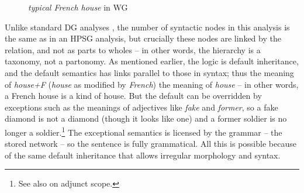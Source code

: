 \documentclass[output=paper
 	        ,biblatex
                ,babelshorthands
                ,newtxmath
                ,draftmode
                ,colorlinks, citecolor=brown
]{langscibook}
\begin{document}
\begin{figure}
	\centering
{}
	\caption{\emph{typical French house} in WG}
	\label{fig:9}
\end{figure}

Unlike standard DG analyses \citep{MuellerEvaluating}, the number of syntactic nodes in this
analysis is the same as in an HPSG analysis, but crucially these nodes are linked by the 
relation, and not as parts to wholes – in other words, the hierarchy is a taxonomy, not a
partonomy. As mentioned earlier, the logic is default inheritance, and the default semantics has
 links parallel to those in syntax; thus the meaning of \emph{house+F} (\emph{house} as
modified by \emph{French})  the meaning of \emph{house} – in other words, a French house is
a kind of house. But the default can be overridden by exceptions such as the meanings of adjectives
like \emph{fake} and \emph{former}, so a fake diamond is not a diamond (though it looks like one)
and a former soldier is no longer a soldier.\footnote{
See also  on adjunct scope.
} The exceptional semantics is licensed by the grammar –
the stored network – so the sentence is fully grammatical. All this is possible because of the same
default inheritance that allows irregular morphology and syntax.
\end{document}
